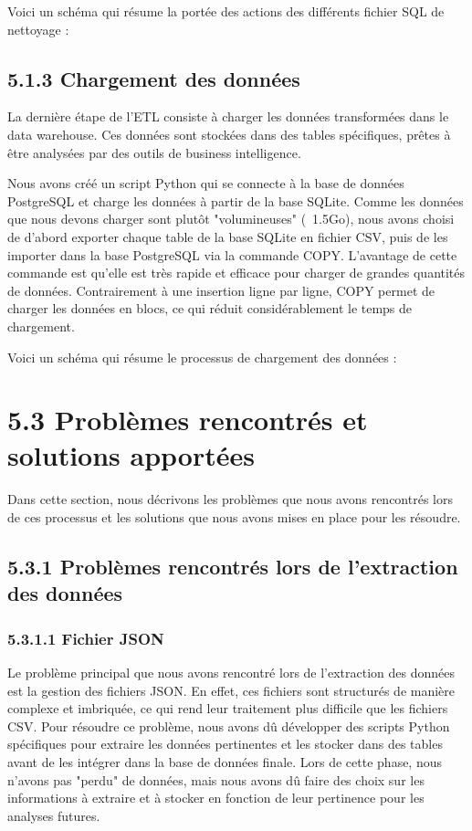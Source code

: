 Voici un schéma qui résume la portée des actions des différents fichier SQL de nettoyage :


\subsection{5.1.3 Chargement des données}

La dernière étape de l’ETL consiste à charger les données transformées dans le data warehouse. Ces données sont stockées dans des tables spécifiques, prêtes à être
analysées par des outils de business intelligence.

Nous avons créé un script Python qui se connecte à la base de données PostgreSQL et charge les données à partir de la base SQLite.
Comme les données que nous devons charger sont plutôt "volumineuses" (~1.5Go), nous avons choisi de d'abord exporter chaque table de la base SQLite en fichier CSV, puis de les
importer dans la base PostgreSQL via la commande COPY. L'avantage de cette commande est qu'elle est très rapide et efficace pour charger de grandes quantités de données.
Contrairement à une insertion ligne par ligne, COPY permet de charger les données en blocs, ce qui réduit considérablement le temps de chargement.

Voici un schéma qui résume le processus de chargement des données :


\section{5.3 Problèmes rencontrés et solutions apportées}

Dans cette section, nous décrivons les problèmes que nous avons rencontrés lors de ces processus et les solutions que nous avons mises en place pour les résoudre.

\subsection{5.3.1 Problèmes rencontrés lors de l'extraction des données}


\subsubsection{5.3.1.1 Fichier JSON}

Le problème principal que nous avons rencontré lors de l'extraction des données est la gestion des fichiers JSON.
En effet, ces fichiers sont structurés de manière complexe et imbriquée, ce qui rend leur traitement plus difficile que les fichiers CSV.
Pour résoudre ce problème, nous avons dû développer des scripts Python spécifiques pour extraire les données pertinentes et les stocker dans des tables avant de les intégrer dans la base de données finale.
Lors de cette phase, nous n'avons pas "perdu" de données, mais nous avons dû faire des choix sur les informations à extraire et à stocker en fonction de leur pertinence pour les analyses futures.

